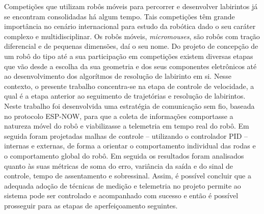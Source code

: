 Competições que utilizam robôs móveis para percorrer e desenvolver labirintos já se encontram consolidadas há algum tempo. Tais competições têm grande importância no cenário internacional para estudo da robótica dado o seu caráter complexo e multidisciplinar. Os robôs móveis, \textit{micromouses}, são robôs com tração diferencial e de pequenas dimensões, daí o seu nome. Do projeto de concepção de um robô do tipo até a sua participação em competições existem diversas etapas que vão desde a escolha da sua geometria e dos seus componentes eletrônicos até ao desenvolvimento dos algorítmos de resolução de labirinto em si. Nesse contexto, o presente trabalho concentra-se na etapa de controle de velocidade, a qual é a etapa anterior ao seguimento de trajetórias e resolução de labirintos. Neste trabalho foi desenvolvida uma estratégia de comunicação sem fio, baseada no protocolo ESP-NOW, para que a coleta de informações comportasse a natureza móvel do robô e viabilizasse a telemetria em tempo real do robô. Em seguida foram projetadas malhas de controle -- utilizando o controlador PID -- internas e externas, de forma a orientar o comportamento individual das rodas e o comportamento global do robô. Em seguida os resultados foram analisados quanto às suas métricas de soma do erro, variância da saída e do sinal de controle, tempo de assentamento e sobressinal. Assim, é possível concluir que a adequada adoção de técnicas de medição e telemetria no projeto permite ao sistema pode ser controlado e acompanhado com sucesso e então é possível prosseguir para as etapas de aperfeiçoamento seguintes.

